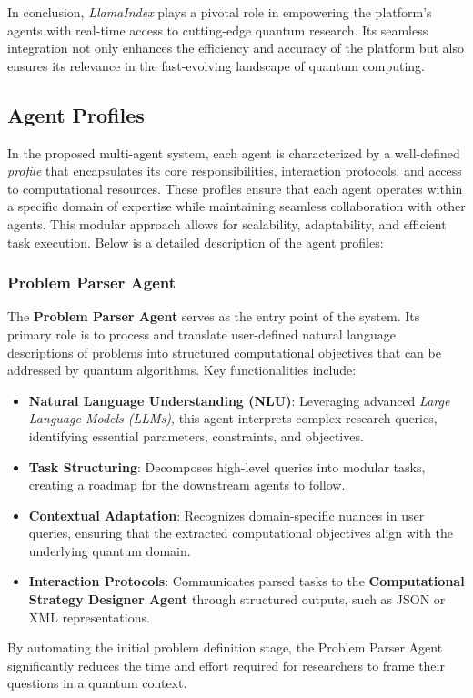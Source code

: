 \documentclass[12pt]{article}
\begin{document}
In conclusion, \textit{LlamaIndex} plays a pivotal role in empowering the platform's agents with real-time access to cutting-edge quantum research. Its seamless integration not only enhances the efficiency and accuracy of the platform but also ensures its relevance in the fast-evolving landscape of quantum computing.



\subsection{Agent Profiles}
In the proposed multi-agent system, each agent is characterized by a well-defined \textit{profile} that encapsulates its core responsibilities, interaction protocols, and access to computational resources. These profiles ensure that each agent operates within a specific domain of expertise while maintaining seamless collaboration with other agents. This modular approach allows for scalability, adaptability, and efficient task execution. Below is a detailed description of the agent profiles:

\subsubsection{Problem Parser Agent}
The \textbf{Problem Parser Agent} serves as the entry point of the system. Its primary role is to process and translate user-defined natural language descriptions of problems into structured computational objectives that can be addressed by quantum algorithms. Key functionalities include:
\begin{itemize}
    \item \textbf{Natural Language Understanding (NLU)}: Leveraging advanced \textit{Large Language Models (LLMs)}, this agent interprets complex research queries, identifying essential parameters, constraints, and objectives.
    \item \textbf{Task Structuring}: Decomposes high-level queries into modular tasks, creating a roadmap for the downstream agents to follow.
    \item \textbf{Contextual Adaptation}: Recognizes domain-specific nuances in user queries, ensuring that the extracted computational objectives align with the underlying quantum domain.
    \item \textbf{Interaction Protocols}: Communicates parsed tasks to the \textbf{Computational Strategy Designer Agent} through structured outputs, such as JSON or XML representations.
\end{itemize}
By automating the initial problem definition stage, the Problem Parser Agent significantly reduces the time and effort required for researchers to frame their questions in a quantum context.
\end{document}
